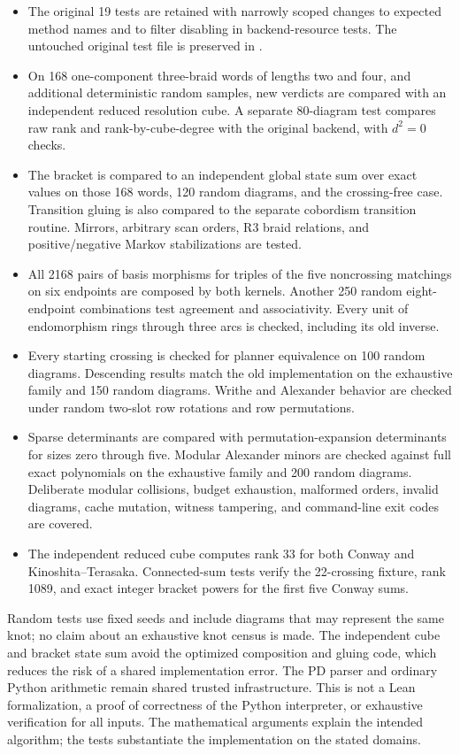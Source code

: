 \documentclass[11pt]{article}
\theoremstyle{remark}\newtheorem{remark}[theorem]{Remark}
\newcommand{\code}[1]{\texttt{\detokenize{#1}}}
\begin{document}
\begin{itemize}[itemsep=3pt]
\item The original 19 tests are retained with narrowly scoped changes to
expected method names and to filter disabling in backend-resource tests.
The untouched original test file is preserved in \code{reference/}.
\item On 168 one-component three-braid words of lengths two and four, and
additional deterministic random samples, new verdicts are compared with an
independent reduced resolution cube. A separate 80-diagram test compares raw
rank and rank-by-cube-degree with the original backend, with $d^2=0$ checks.
\item The bracket is compared to an independent global state sum over exact
\code{Fraction} values on those 168 words, 120 random diagrams, and the
crossing-free case. Transition gluing is also compared to the separate
cobordism transition routine. Mirrors, arbitrary scan orders, R3 braid
relations, and positive/negative Markov stabilizations are tested.
\item All 2168 pairs of basis morphisms for triples of the five noncrossing
matchings on six endpoints are composed by both kernels. Another 250 random
eight-endpoint combinations test agreement and associativity. Every unit of
endomorphism rings through three arcs is checked, including its old inverse.
\item Every starting crossing is checked for planner equivalence on 100
random diagrams. Descending results match the old implementation on the
exhaustive family and 150 random diagrams. Writhe and Alexander behavior are
checked under random two-slot row rotations and row permutations.
\item Sparse determinants are compared with permutation-expansion determinants
for sizes zero through five. Modular Alexander minors are checked against
full exact polynomials on the exhaustive family and 200 random diagrams.
Deliberate modular collisions, budget exhaustion, malformed orders, invalid
diagrams, cache mutation, witness tampering, and command-line exit codes are
covered.
\item The independent reduced cube computes rank 33 for both Conway and
Kinoshita--Terasaka. Connected-sum tests verify the 22-crossing fixture, rank
1089, and exact integer bracket powers for the first five Conway sums.
\end{itemize}

Random tests use fixed seeds and include diagrams that may represent the same
knot; no claim about an exhaustive knot census is made. The independent cube
and bracket state sum avoid the optimized composition and gluing code, which
reduces the risk of a shared implementation error. The PD parser and ordinary
Python arithmetic remain shared trusted infrastructure. This is not a Lean
formalization, a proof of correctness of the Python interpreter, or exhaustive
verification for all inputs. The mathematical arguments explain the intended
algorithm; the tests substantiate the implementation on the stated domains.
\end{document}
